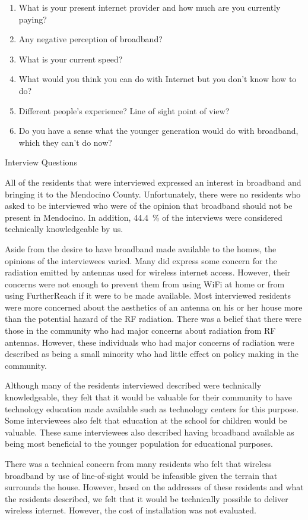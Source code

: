 \begin{table}
\begin{enumerate}
    \item What is your present internet provider and how much are you currently paying?
    \item Any negative perception of broadband?
    \item What is your current speed?
    \item What would you think you can do with Internet but you don’t know how to do?
    \item Different people’s experience? Line of sight point of view?
    \item Do you have a sense what the younger generation would do with broadband, which they can’t do now?
\end{enumerate}
\caption{Interview Questions}
\label{tab:questions} 
\end{table}

All of the residents that were interviewed expressed an interest in broadband and bringing it
to the Mendocino County. Unfortunately, there were no residents who asked to be interviewed who 
were of the opinion that broadband should not be present in Mendocino. In addition, 44.4~\% of
the interviews were considered technically knowledgeable by us.

Aside from the desire to have broadband made available to the homes, the opinions of the 
interviewees varied. Many did express some concern for the radiation emitted by antennas
used for wireless internet access. However, their concerns were not enough to prevent them
from using WiFi at home or from using FurtherReach if it were to be made available.
Most interviewed residents were more concerned about the aesthetics of an antenna on his or her
house more than the potential hazard of the RF radiation.
There was a belief that there were those in the community who had major concerns about radiation
from RF antennas. However, these individuals who had major concerns of radiation were described
as being a small minority who had little effect on policy making in the community.

Although many of the residents interviewed described were technically knowledgeable, they felt
that it would be valuable for their community to have technology education made available such
as technology centers for this purpose. Some interviewees also felt that education at the school
for children would be valuable. These same interviewees also described having broadband available
as being most beneficial to the younger population for educational purposes.

There was a technical concern from many residents who felt that wireless broadband by use of
line-of-sight would be infeasible given the terrain that surrounds the house. However, based
on the addresses of these residents and what the residents described, we felt
that it would be technically possible to deliver wireless internet. However, the cost of
installation was not evaluated.

